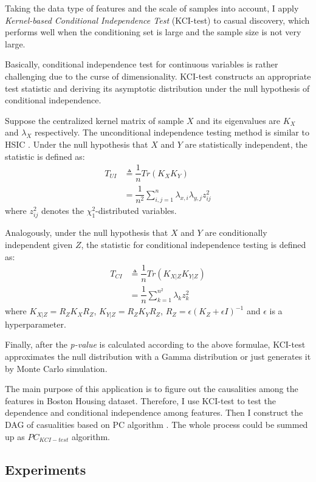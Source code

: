 \documentclass[12pt,a4paper]{article}
\theoremstyle{definition}
\begin{document}
Taking the data type of features and the scale of samples into account, I apply \textit{Kernel-based Conditional Independence Test} (KCI-test) \cite{alg} to casual discovery, which performs well when the conditioning set is large and the sample size is not very large.

Basically, conditional independence test for continuous variables is rather challenging due to the curse of dimensionality. KCI-test constructs an appropriate test statistic and deriving its asymptotic distribution under the null hypothesis of conditional independence.

Suppose the centralized kernel matrix of sample $X$ and its eigenvalues are $K_X$ and $\lambda_X$ respectively. The unconditional independence testing method is similar to HSIC \cite{HSIC}. Under the null hypothesis that $X$ and $Y$ are statistically independent, the statistic is defined as:
\begin{align*}
	T_{UI} & \triangleq \dfrac{1}{n}Tr(K_{X}K_{Y}) \\
	& = \dfrac{1}{n^2}\sum_{i,j=1}^{n}\lambda_{x,i}\lambda_{y,j}z^2_{ij}
\end{align*}
where $z^2_{ij}$ denotes the $\chi^2_1$-distributed variables.

Analogously, under the null hypothesis that $X$ and $Y$ are conditionally independent given $Z$, the statistic for conditional independence testing is defined as:
\begin{align*}
	T_{CI} & \triangleq \dfrac{1}{n}Tr(K_{X|Z}K_{Y|Z}) \\
	& = \dfrac{1}{n}\sum_{k=1}^{n^2}\lambda_{k}z^2_{k}
\end{align*}
where $K_{X|Z}=R_ZK_XR_Z$, $K_{Y|Z}=R_ZK_YR_Z$, $R_Z=\epsilon(K_Z+\epsilon I)^{-1}$ and $\epsilon$ is a hyperparameter.

Finally, after the \textit{p-value} is calculated according to the above formulae, KCI-test approximates the null distribution with a Gamma distribution or just generates it by Monte Carlo simulation.

The main purpose of this application is to figure out the causalities among the features in Boston Housing dataset. Therefore, I use KCI-test to test the dependence and conditional independence among features. Then I construct the DAG of casualities based on PC algorithm \cite{pc-alg}. The whole process could be summed up as $PC_{KCI-test}$ algorithm.

\subsection{Experiments}
\end{document}

